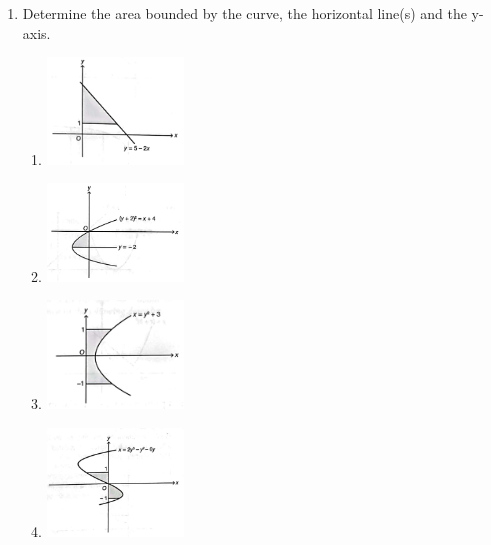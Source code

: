 \documentclass{report}
\begin{document}
\begin{multicols*}{2}
\begin{enumerate}
            \item Determine the area bounded by the curve, the horizontal line(s) and the y-axis.
                  \begin{enumerate}
                        \item \includegraphics[width=0.3\textwidth,valign=t]{./images/5.png}
                        \item \includegraphics[width=0.3\textwidth,valign=t]{./images/6.png}
                        \item \includegraphics[width=0.3\textwidth,valign=t]{./images/7.png}
                        \item \includegraphics[width=0.3\textwidth,valign=t]{./images/8.png}
                  \end{enumerate}


\end{enumerate}
\end{multicols*}
\end{document}
